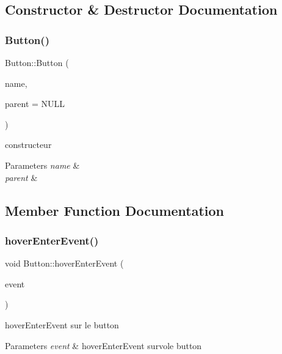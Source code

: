 \subsection{Constructor \& Destructor Documentation}
\mbox{\label{class_button_a69976e5c00874a3807b642f249c1c776}} 
\subsubsection{\texorpdfstring{Button()}{Button()}}
{\footnotesize\ttfamily Button\+::\+Button (\begin{DoxyParamCaption}\item[{Q\+String}]{name,  }\item[{Q\+Graphics\+Item $\ast$}]{parent = {\ttfamily NULL} }\end{DoxyParamCaption})}



constructeur 


\begin{DoxyParams}{Parameters}
{\em name} & \\
\hline
{\em parent} & \\
\hline
\end{DoxyParams}


\subsection{Member Function Documentation}
\mbox{\label{class_button_a633a9684818bc5d300a622a00064f09c}} 
\subsubsection{\texorpdfstring{hoverEnterEvent()}{hoverEnterEvent()}}
{\footnotesize\ttfamily void Button\+::hover\+Enter\+Event (\begin{DoxyParamCaption}\item[{Q\+Graphics\+Scene\+Hover\+Event $\ast$}]{event }\end{DoxyParamCaption})}



hover\+Enter\+Event sur le button 


\begin{DoxyParams}{Parameters}
{\em event} & hover\+Enter\+Event survole button \\
\hline
\end{DoxyParams}
\mbox{\label{class_button_a1689a97690d9469ce8350d24db0d7485}} 
